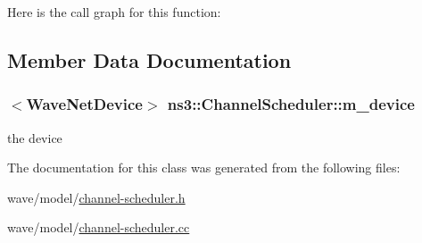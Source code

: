 Here is the call graph for this function\+:




\subsection{Member Data Documentation}
\subsubsection[{\texorpdfstring{m\+\_\+device}{m_device}}]{$<${\bf Wave\+Net\+Device}$>$ ns3\+::\+Channel\+Scheduler\+::m\+\_\+device\hspace{0.3cm}{\ttfamily [protected]}}\hypertarget{classns3_1_1ChannelScheduler_ac3d6c3071b8c796afb73789844968405}{}\label{classns3_1_1ChannelScheduler_ac3d6c3071b8c796afb73789844968405}


the device 



The documentation for this class was generated from the following files\+:\begin{DoxyCompactItemize}
\item 
wave/model/\hyperlink{channel-scheduler_8h}{channel-\/scheduler.\+h}\item 
wave/model/\hyperlink{channel-scheduler_8cc}{channel-\/scheduler.\+cc}\end{DoxyCompactItemize}
